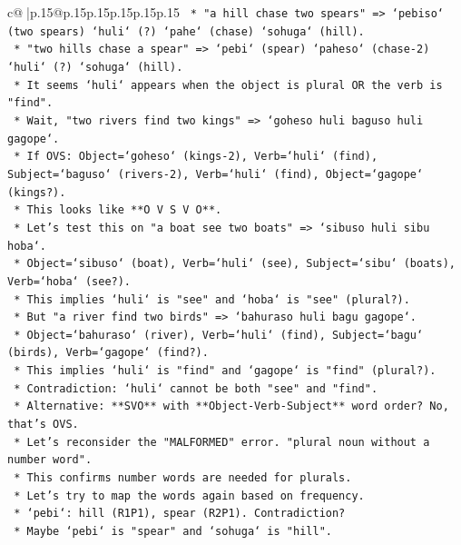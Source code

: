 \documentclass{article}
\begin{document}
{\begin{supertabular}{c@{$\;$}|p{.15\linewidth}@{}p{.15\linewidth}p{.15\linewidth}p{.15\linewidth}p{.15\linewidth}p{.15\linewidth}}
{{{\texttt{                *   "a hill chase two spears" => `pebiso` (two spears) `huli` (?) `pahe` (chase) `sohuga` (hill).} \\
\texttt{                *   "two hills chase a spear" => `pebi` (spear) `paheso` (chase{-}2) `huli` (?) `sohuga` (hill).} \\
\texttt{                *   It seems `huli` appears when the object is plural OR the verb is "find".} \\
\texttt{                *   Wait, "two rivers find two kings" => `goheso huli baguso huli gagope`.} \\
\texttt{                *   If OVS: Object=`goheso` (kings{-}2), Verb=`huli` (find), Subject=`baguso` (rivers{-}2), Verb=`huli` (find), Object=`gagope` (kings?).} \\
\texttt{                *   This looks like **O V S V O**.} \\
\texttt{                *   Let's test this on "a boat see two boats" => `sibuso huli sibu hoba`.} \\
\texttt{                    *   Object=`sibuso` (boat), Verb=`huli` (see), Subject=`sibu` (boats), Verb=`hoba` (see?).} \\
\texttt{                    *   This implies `huli` is "see" and `hoba` is "see" (plural?).} \\
\texttt{                    *   But "a river find two birds" => `bahuraso huli bagu gagope`.} \\
\texttt{                    *   Object=`bahuraso` (river), Verb=`huli` (find), Subject=`bagu` (birds), Verb=`gagope` (find?).} \\
\texttt{                    *   This implies `huli` is "find" and `gagope` is "find" (plural?).} \\
\texttt{                    *   Contradiction: `huli` cannot be both "see" and "find".} \\
\texttt{        *   Alternative: **SVO** with **Object{-}Verb{-}Subject** word order? No, that's OVS.} \\
\texttt{        *   Let's reconsider the "MALFORMED" error. "plural noun without a number word".} \\
\texttt{        *   This confirms number words are needed for plurals.} \\
\texttt{        *   Let's try to map the words again based on frequency.} \\
\texttt{            *   `pebi`: hill (R1P1), spear (R2P1). Contradiction?} \\
\texttt{            *   Maybe `pebi` is "spear" and `sohuga` is "hill".} \\
}}}
\end{supertabular}}
\end{document}
